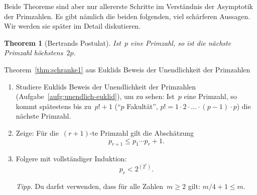 \documentclass[twoside]{../zirkelblatt1415}
\theoremstyle{definition}
\theoremstyle{plain}
\newtheorem{thm}[defn]{Theorem}
\theoremstyle{remark}
\begin{document}
Beide Theoreme sind aber nur allererste Schritte im Verständnis der Asymptotik
der Primzahlen. Es gibt nämlich die beiden folgenden, viel schärferen Aussagen.
Wir werden sie später im Detail diskutieren.

\begin{thm}[Bertrands Postulat]Ist~$p$ eine Primzahl, so ist die nächste
Primzahl höchstens~$2p$.
\end{thm}

\begin{aufgabe}{Theorem~\ref{thm:schranke1} aus Euklids Beweis der
Unendlichkeit der Primzahlen}
\begin{enumerate}
\item Studiere Euklids Beweis der Unendlichkeit der Primzahlen
(Aufgabe~\ref{aufg:unendlich-euklid}), um zu sehen: Ist~$p$ eine Primzahl, so
kommt spätestens bis zu~$p! + 1$ ("`$p$ Fakultät"', $p! = 1 \cdot 2 \cdot
\ldots \cdot (p-1) \cdot p$) die nächste Primzahl.
\item Zeige: Für die~$(r+1)$-te Primzahl gilt die Abschätzung
\[ p_{r+1} \leq p_1 \cdots p_r + 1. \]
\item Folgere mit vollständiger Induktion:
\[ p_r < 2^{(2^r)}. \]

\emph{Tipp.} Du darfst verwenden, dass für alle Zahlen~$m \geq 2$ gilt: $m/4 +
1 \leq m$.
\end{enumerate}\fixlistspacing
\end{aufgabe}
\end{document}
